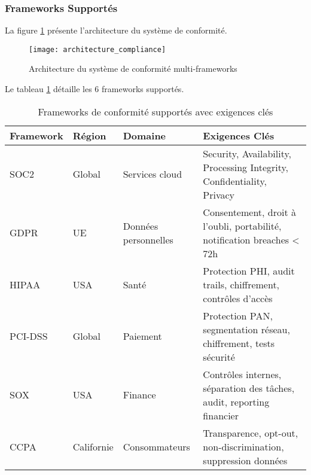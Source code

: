\subsubsection{Frameworks Supportés}

La figure \ref{fig:architecture_compliance} présente l'architecture du système de conformité.

\begin{figure}[htpb]
\centering
\texttt{[image: architecture\_compliance]}
\caption{Architecture du système de conformité multi-frameworks}
\label{fig:architecture_compliance}
\end{figure}

Le tableau \ref{tab:frameworks_compliance} détaille les 6 frameworks supportés.

\begin{table}[htpb]
\centering
\caption{Frameworks de conformité supportés avec exigences clés}
\label{tab:frameworks_compliance}
\begin{tabular}{|p{}|p{}|p{}|p{}|}
\hline
\textbf{Framework} & \textbf{Région} & \textbf{Domaine} & \textbf{Exigences Clés} \\
\hline
SOC2 & Global & Services cloud & Security, Availability, Processing Integrity, Confidentiality, Privacy \\
\hline
GDPR & UE & Données personnelles & Consentement, droit à l'oubli, portabilité, notification breaches < 72h \\
\hline
HIPAA & USA & Santé & Protection PHI, audit trails, chiffrement, contrôles d'accès \\
\hline
PCI-DSS & Global & Paiement & Protection PAN, segmentation réseau, chiffrement, tests sécurité \\
\hline
SOX & USA & Finance & Contrôles internes, séparation des tâches, audit, reporting financier \\
\hline
CCPA & Californie & Consommateurs & Transparence, opt-out, non-discrimination, suppression données \\
\hline
\end{tabular}
\end{table}

